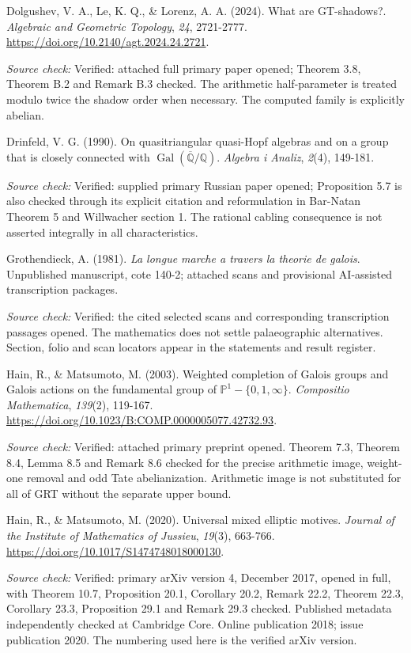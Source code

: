 \documentclass[10pt,a4paper]{article}
\begin{document}
Dolgushev, V. A., Le, K. Q., \& Lorenz, A. A. (2024). What are GT-shadows?. \emph{Algebraic and Geometric Topology}, \emph{24}, 2721-2777. \url{https://doi.org/10.2140/agt.2024.24.2721}.

\emph{Source check:} Verified: attached full primary paper opened; Theorem 3.8, Theorem B.2 and Remark B.3 checked. The arithmetic half-parameter is treated modulo twice the shadow order when necessary. The computed family is explicitly abelian.

Drinfeld, V. G. (1990). On quasitriangular quasi-Hopf algebras and on a group that is closely connected with \(\operatorname{Gal}(\overline{\mathbb Q}/\mathbb Q)\). \emph{Algebra i Analiz}, \emph{2}(4), 149-181.

\emph{Source check:} Verified: supplied primary Russian paper opened; Proposition 5.7 is also checked through its explicit citation and reformulation in Bar-Natan Theorem 5 and Willwacher section 1. The rational cabling consequence is not asserted integrally in all characteristics.

Grothendieck, A. (1981). \emph{La longue marche a travers la theorie de galois}. Unpublished manuscript, cote 140-2; attached scans and provisional AI-assisted transcription packages.

\emph{Source check:} Verified: the cited selected scans and corresponding transcription passages opened. The mathematics does not settle palaeographic alternatives. Section, folio and scan locators appear in the statements and result register.

Hain, R., \& Matsumoto, M. (2003). Weighted completion of Galois groups and Galois actions on the fundamental group of \(\mathbb P^1-\{0,1,\infty\}\). \emph{Compositio Mathematica}, \emph{139}(2), 119-167. \url{https://doi.org/10.1023/B:COMP.0000005077.42732.93}.

\emph{Source check:} Verified: attached primary preprint opened. Theorem 7.3, Theorem 8.4, Lemma 8.5 and Remark 8.6 checked for the precise arithmetic image, weight-one removal and odd Tate abelianization. Arithmetic image is not substituted for all of GRT without the separate upper bound.

Hain, R., \& Matsumoto, M. (2020). Universal mixed elliptic motives. \emph{Journal of the Institute of Mathematics of Jussieu}, \emph{19}(3), 663-766. \url{https://doi.org/10.1017/S1474748018000130}.

\emph{Source check:} Verified: primary arXiv version 4, December 2017, opened in full, with Theorem 10.7, Proposition 20.1, Corollary 20.2, Remark 22.2, Theorem 22.3, Corollary 23.3, Proposition 29.1 and Remark 29.3 checked. Published metadata independently checked at Cambridge Core. Online publication 2018; issue publication 2020. The numbering used here is the verified arXiv version.
\end{document}

